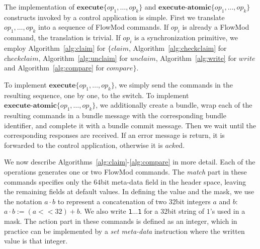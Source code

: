 \documentclass[conference]{sigcomm-alternate}
\newcommand{\concat}[0]{\cdot}
\newcommand{\exec}{\textbf{execute}}
\newcommand{\execatomic}{\textbf{execute-atomic}}
\newcommand{\ack}{\textit{ack}}
\begin{document}
The implementation of $\exec\{op_1,\ldots,op_k\}$ and
$\execatomic\{op_1,\ldots,op_k\}$ constructs
invoked by a control application is simple.
First we translate  $op_1,\ldots,op_k$ into a sequence of FlowMod
commands. If $op_i$ is already a FlowMod command, the translation is
trivial. If $op_i$ is a synchronization primitive, we employ 
Algorithm~\ref{alg:claim} for $\{\textit{claim}$, 
Algorithm~\ref{alg:checkclaim} for $\textit{checkclaim}$, 
Algorithm~\ref{alg:unclaim}
for $\textit{unclaim}$,
Algorithm~\ref{alg:write} for $\textit{write}$ and
Algorithm~\ref{alg:compare} for $\textit{compare}\}$. 

To implement  $\exec\{op_1,\ldots,op_k\}$, we simply send the commands in
the resulting sequence, one by one, to the switch.
%
To implement  $\execatomic\{op_1,\ldots,op_k\}$, we
additionally create a bundle, wrap each of the resulting commands in a
bundle message with the corresponding bundle identifier, and complete it
with a bundle commit message.
Then we wait until the
corresponding responses are received.
If an error message is return,
it is forwarded to the control application,
otherwise it is $\ack$ed.

We now describe Algorithms~\ref{alg:claim}-\ref{alg:compare} in more
detail.
Each of the operations generates one or two FlowMod commands.
The \textit{match} part in these commands specifies only the $64$bit meta-data
field in the header space, leaving the remaining fields at default
values.
In defining the value and the mask, 
we
use the notation $a\concat b$ to represent a concatenation of two
$32$bit integers $a$ and $b$: $a\concat b := (a<<32)+b$.
We also write \texttt{1$\ldots$1} for  a $32$bit
string of $1$'s used in a mask.
%
The action part in these commands is defined as an integer, which in
practice can be implemented by a \emph{set meta-data} instruction where the written value is that integer.
\end{document}
